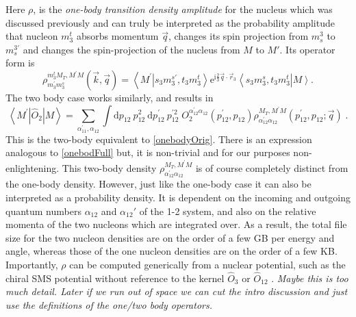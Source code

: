 \documentclass[a4paper,11pt]{article}
\newcommand\bv[1]{\vec{#1}}
\newcommand{\ques}[1]{\color{red}\textit{ #1 }\color{black}}
\begin{document}
Here $\rho$, is the \textit{one-body transition density amplitude}
for the nucleus which was discussed previously and can truly be
interpreted as the probability amplitude that nucleon $m_3^t$ absorbs
momentum $\bv{q}$, changes its spin projection from $m_s^3$ to
$m_s^{3'}$ and changes the spin-projection of the nucleus from $M$ to
$M'$. Its operator form is
\begin{equation}
  \rho_{m_{3}^{\prime} m_{3}^{s}}^{m_{3}^{t} M_{T}, M^{\prime}
  M}(\bv{k}, \bv{q})=\left\langle M^{\prime}\right.\left|s_{3}
  m_{3}^{s \prime}, t_{3} m_{3}^{t}\right\rangle
  \mathrm{e}^{\mathrm{i} \frac{2}{3} \bv{q} \cdot
  \bv{r}_{3}}\left\langle s_{3} m_{3}^{s}, t_{3}
  m_{3}^{t}\right|\left. M\right\rangle\label{onebodydens}.
\end{equation}
The two body case works similarly, and results in
\begin{equation}
  \left\langle M^{\prime}\left|\hat{O}_{2}\right| M\right\rangle =
  \sum_{\alpha_{11}^{\prime}, \alpha_{12}} \int \mathrm{d} p_{12}\:
  p_{12}^{2} \mathrm{~d} p_{12}^{\prime}\: p_{12}^{\prime 2}\;
  O_{2}^{\alpha_{12}^{\prime} \alpha_{12}}\left(p_{12}^{\prime},
  p_{12}\right) \rho_{\alpha_{12}^{\prime} \alpha_{12}}^{M_{T},
  M^{\prime} M}\left(p_{12}^{\prime}, p_{12} ; \bv{q}\right)\label{twobody}\;.
\end{equation}
This is the two-body equivalent to \eqref{onebodyOrig}.
There is an expression analogous to \eqref{onebodFull} but, it is non-trivial and for our purposes non-enlightening.
This two-body density $\rho_{\alpha_{12}^{\prime}
\alpha_{12}}^{M_{T}, M^{\prime} M}$ is of course completely distinct
from the one-body density. 
However, just like the one-body case it can also be interpreted as a probability density.
It is dependent on the incoming and outgoing quantum numbers
$\alpha_{12}$ and $\alpha_{12}'$ of the 1-2 system, and also on the
relative momenta of the two nucleons which are integrated over.
As a result, the total file size for the two nucleon densities are on
the order of a few GB per energy and angle, whereas those of the one
nucleon densities are on the order of a few KB.
Importantly, $\rho$ can be computed generically from a nuclear
potential, such as the chiral SMS potential
without reference to the kernel $\hat{O}_3$ or $\hat{O}_{12}$
\cite{Reinert2018}.
\ques{Maybe this is too much detail. Later if we run out of space we can cut the intro discussion and just use the definitions
of the one/two body operators.}
\end{document}
